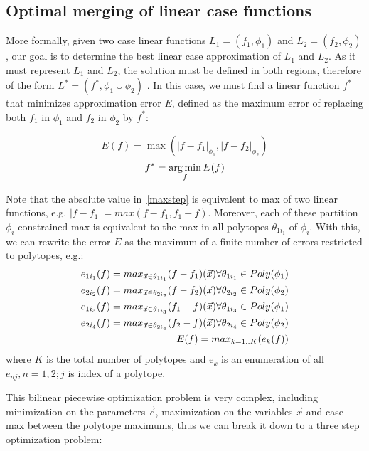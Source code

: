 \subsection{ Optimal merging of linear case functions}
More formally, given two case linear functions $L_1 = ( f_1, \phi_1 )$ and $L_2 = ( f_2, \phi_2 )$, our goal is to determine the best linear case approximation of $L_1$ and $L_2$. As it must represent  $L_1$ and $L_2$, the solution must be defined in both regions, therefore of the form $L^* = (f^*,\phi_1 \cup  \phi_2)$ . In this case, we must find a linear function $f^*$ that minimizes approximation error $E$, defined as the maximum  error of replacing both $f_1$ in $\phi_1$ and $f_2$ in $\phi_2$ by $f^*$:

\begin{equation} E(f) = \max ( |f - f_1|_{\phi_1} , |f - f_2|_{\phi_2} ) \label{maxstep} \end{equation}
\begin{equation} f^* = \argmin_f E(f)  \label{minstep} \end{equation}

Note that the absolute value in~\ref{maxstep} is equivalent to max of two linear functions, e.g. $|f - f_1| = max ( f - f_1, f_1 - f)$. Moreover, each of these partition $\phi_i$ constrained max is equivalent to the max in all polytopes $\theta_{1{i_1}}$ of $\phi_i$. With this, we can rewrite the error $E$ as the maximum of a finite number of errors restricted to polytopes, e.g.:
{%
\begin{align}
\footnotesize
 e_{1{i_1}}(f) = max_{\vec{x} \in \theta_{1{i_1}}} (f - f_1)(\vec{x}) \forall \theta_{1{i_1}} \in Poly(\phi_1) \nonumber\\
 e_{2{i_2}}(f) = max_{\vec{x} \in \theta_{2{i_2}}} (f - f_2)(\vec{x}) \forall \theta_{2{i_2}} \in Poly(\phi_2) \nonumber\\
 e_{1{i_3}}(f) = max_{\vec{x} \in \theta_{1{i_3}}} (f_1 - f)(\vec{x}) \forall \theta_{1{i_3}} \in Poly(\phi_1) \nonumber\\
 e_{2{i_4}}(f) = max_{\vec{x} \in \theta_{2{i_4}}} (f_2 - f)(\vec{x}) \forall \theta_{2{i_4}} \in Poly(\phi_2)\nonumber\\
E(f) = max_{k=1..K} (e_k(f)) \nonumber
\end{align}
where $K$ is the total number of polytopes and e$ _k$ is an enumeration of all $e_{nj}, n = 1,2; j $ is index of a polytope.
}

This bilinear piecewise optimization problem is very complex, including minimization on the parameters $\vec{c}$, maximization on the variables $\vec{x}$ and case max between the polytope maximums, thus we can break it down to a three step optimization problem: 

